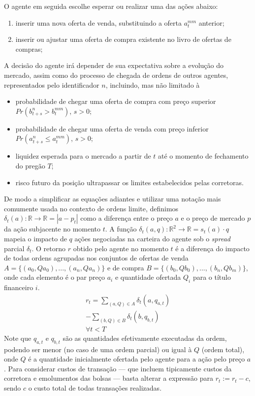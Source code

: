 O agente em seguida escolhe esperar ou realizar uma das ações abaixo:
\begin{enumerate}
    \item inserir uma nova oferta de venda, substituindo a oferta $a_t^{mm}$ anterior;
    \item inserir ou ajustar uma oferta de compra existente no livro de ofertas de compras;
\end{enumerate}

A decisão do agente irá depender de sua expectativa sobre a evolução do mercado, assim como do processo de chegada de ordens de outros agentes, representados pelo identificador $n$, incluindo, mas não limitado à
\begin{itemize}
    \item probabilidade de chegar uma oferta de compra com preço superior $Pr(b_{t + s}^{n} > b_{t}^{mm})$, $s > 0$; 
    \item probabilidade de chegar uma oferta de venda com preço inferior $Pr(a_{t + s}^{n} \leq a_{t}^{mm})$, $s > 0$;
    \item liquidez esperada para o mercado a partir de $t$ até o momento de fechamento do pregão $T$;
    \item risco futuro da posição ultrapassar os limites estabelecidos pelas corretoras.
\end{itemize}

De modo a simplificar as equações adiantes e utilizar uma notação mais comumente usada no contexto de ordens limite, definimos $\delta_{t}(a): \mathbb{R} \rightarrow \mathbb{R} = |a - p_{t}|$ como a diferença entre o preço $a$ e o preço de mercado $p$ da ação subjacente no momento $t$.
A função $\delta_{t}(a, q): \mathbb{R}^{2} \rightarrow \mathbb{R} = s_{t}(a) \cdot q$ mapeia o impacto de $q$ ações negociadas na carteira do agente sob o \textit{spread} parcial $\delta_t$.
O retorno $r$ obtido pelo agente no momento $t$ é a diferença do impacto de todas ordens agrupadas nos conjuntos de ofertas de venda $A = \{(a_{0}, Qa_{0}), ..., (a_{n}, Qa_{n})\}$ e de compra $B = \{(b_{0}, Qb_{0}), ..., (b_{n}, Qb_{m})\}$, onde cada elemento é o par preço $a_{i}$ e quantidade ofertada $Q_{i}$ para o título financeiro $i$.
\begin{equation} \label{return}
	\begin{aligned}
		r_{t} = \sum_{(a, Q) \in A} \delta_{t}(a, q_{a, t}) \\
		-\sum_{(b, Q) \in B} \delta_{t}(b, q_{b, t}) \\
		\forall t < T
	\end{aligned}
\end{equation}
Note que $q_{a, t}$ e $q_{b, t}$ são as quantidades efetivamente executadas da ordem, podendo ser menor (no caso de uma ordem parcial) ou igual à $Q$ (ordem total), onde $Q$ é a quantidade inicialmente ofertada pelo agente para a ação pelo preço $a$.
Para considerar custos de transação — que incluem tipicamente custos da corretora e emolumentos das bolsas — basta alterar a expressão para $r_{t} := r_{t} - c$, sendo $c$ o custo total de todas transações realizadas.

